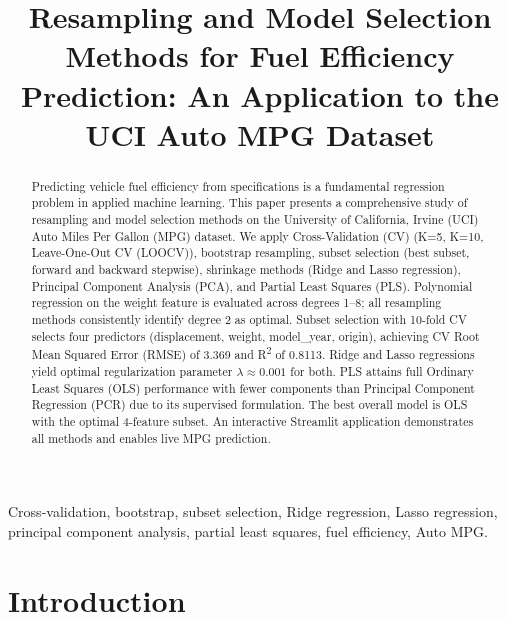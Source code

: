 \documentclass[conference]{IEEEtran}
\begin{document}
\title{Resampling and Model Selection Methods for Fuel Efficiency Prediction: An Application to the UCI Auto MPG Dataset}

\author{
}

\maketitle

\begin{abstract}
Predicting vehicle fuel efficiency from specifications is a fundamental regression problem in applied machine learning. This paper presents a comprehensive study of resampling and model selection methods on the University of California, Irvine (UCI) Auto Miles Per Gallon (MPG) dataset. We apply Cross-Validation (CV) (K=5, K=10, Leave-One-Out CV (LOOCV)), bootstrap resampling, subset selection (best subset, forward and backward stepwise), shrinkage methods (Ridge and Lasso regression), Principal Component Analysis (PCA), and Partial Least Squares (PLS). Polynomial regression on the weight feature is evaluated across degrees 1--8; all resampling methods consistently identify degree 2 as optimal. Subset selection with 10-fold CV selects four predictors (displacement, weight, model\_year, origin), achieving CV Root Mean Squared Error (RMSE) of 3.369 and R\textsuperscript{2} of 0.8113. Ridge and Lasso regressions yield optimal regularization parameter $\lambda \approx 0.001$ for both. PLS attains full Ordinary Least Squares (OLS) performance with fewer components than Principal Component Regression (PCR) due to its supervised formulation. The best overall model is OLS with the optimal 4-feature subset. An interactive Streamlit application demonstrates all methods and enables live MPG prediction.
\end{abstract}

\begin{IEEEkeywords}
Cross-validation, bootstrap, subset selection, Ridge regression, Lasso regression, principal component analysis, partial least squares, fuel efficiency, Auto MPG.
\end{IEEEkeywords}

\section{Introduction}
\label{sec:intro}
\end{document}
